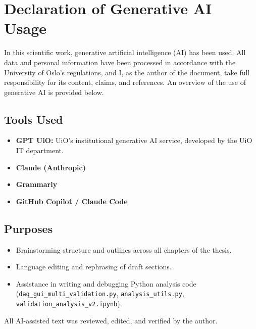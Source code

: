 \chapter*{Declaration of Generative AI Usage}

In this scientific work, generative artificial intelligence (AI) has been
used. All data and personal information have been processed in accordance
with the University of Oslo's regulations, and I, as the author of the
document, take full responsibility for its content, claims, and references.
An overview of the use of generative AI is provided below.

\section*{Tools Used}
\begin{itemize}
  \item \textbf{GPT UiO:} UiO's institutional generative AI service,
        developed by the UiO IT department.
  \item \textbf{Claude (Anthropic)} 
  \item \textbf{Grammarly}
  \item \textbf{GitHub Copilot / Claude Code}
\end{itemize}

\section*{Purposes}
\begin{itemize}
  \item Brainstorming structure and outlines across all chapters of the
        thesis.
  \item Language editing and rephrasing of draft sections.
  \item Assistance in writing and debugging Python analysis code
        (\texttt{daq\_gui\_multi\_validation.py}, \texttt{analysis\_utils.py},
        \texttt{validation\_analysis\_v2.ipynb}).
\end{itemize}

\bigskip
\noindent All AI-assisted text was reviewed, edited, and verified by the
author.